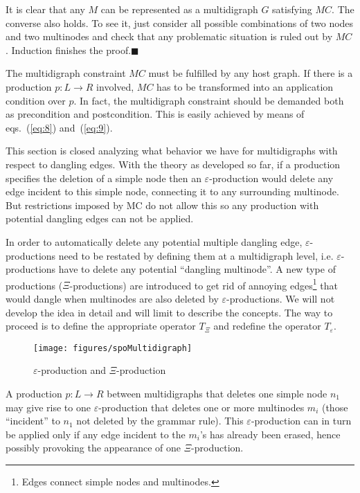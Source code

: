 \documentclass{fundam}
\newcommand{\proofend}{\hfill$\blacksquare$}
\begin{document}
It is clear that any $M$ can be represented as a multidigraph $G$
satisfying $MC$.  The converse also holds.  To see it, just consider
all possible combinations of two nodes and two multinodes and check
that any problematic situation is ruled out by $MC$. Induction
finishes the proof.\proofend

The multidigraph constraint $MC$ must be fulfilled by any host graph.
If there is a production $p:L \rightarrow R$ involved, $MC$ has to be
transformed into an application condition over $p$.  In fact, the
multidigraph constraint should be demanded both as precondition and
postcondition. This is easily achieved by means of eqs.~(\ref{eq:8})
and~(\ref{eq:9}).

This section is closed analyzing what behavior we have for
multidigraphs with respect to dangling edges.  With the theory as
developed so far, if a production specifies the deletion of a simple
node then an $\varepsilon$-production would delete any edge incident
to this simple node, connecting it to any surrounding multinode.  But
restrictions imposed by MC do not allow this so any production with
potential dangling edges can not be applied.

In order to automatically delete any potential multiple dangling edge,
$\varepsilon$-productions need to be restated by defining them at a
multidigraph level, i.e.  $\varepsilon$-productions have to delete any
potential ``dangling multinode''.  A new
type of productions ($\Xi$-productions) are introduced to get rid of
annoying edges\footnote{Edges connect simple nodes and multinodes.}
that would dangle when multinodes are also deleted by
$\varepsilon$-productions. We will not develop the idea in detail and
will limit to describe the concepts.  The way to proceed is to define
the appropriate operator $T_\Xi$ and redefine the operator
$T_\varepsilon$.

\begin{figure}[htbp]
  \centering
  \texttt{[image: figures/spoMultidigraph]}
  \caption{$\varepsilon$-production and $\Xi$-production}
  \label{fig:spoMultidigraph}
\end{figure}

A production $p:L \rightarrow R$ between multidigraphs that deletes
one simple node $n_1$ may give rise to one $\varepsilon$-production
that deletes one or more multinodes $m_i$ (those ``incident'' to $n_1$
not deleted by the grammar rule).  This $\varepsilon$-production can
in turn be applied only if any edge incident to the $m_i$'s has
already been erased, hence possibly provoking the appearance of one
$\Xi$-production.
\end{document}
